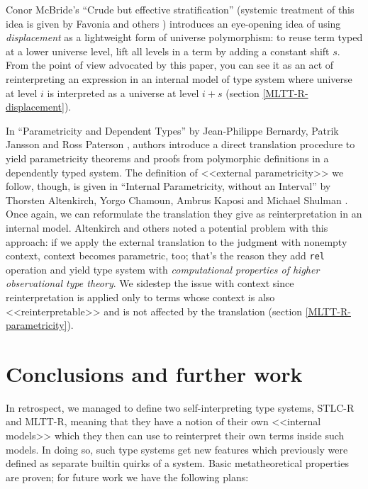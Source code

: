 \documentclass[acmsmall, review, screen, authorversion]{acmart}
\begin{document}
Conor McBride's ``Crude but effective stratification''
\cite{McBride:Crude2002} (systemic treatment of this idea is given by
Favonia and others \cite{Favonia:Displacement2023}) introduces an
eye-opening idea of using \textit{displacement} as a lightweight form
of universe polymorphism: to reuse term typed at a lower universe
level, lift all levels in a term by adding a constant shift $s$. From
the point of view advocated by this paper, you can see it as an act
of reinterpreting an expression in an internal model of type system
where universe at level $i$ is interpreted as a universe at level
$i+s$ (section \ref{MLTT-R-displacement}).

In ``Parametricity and Dependent Types'' by Jean-Philippe Bernardy,
Patrik Jansson and Ross Paterson \cite{Bernardy:Parametricity2010},
authors introduce a direct translation procedure to yield
parametricity theorems and proofs from polymorphic definitions in a
dependently typed system. The definition of <<external
parametricity>> we follow, though, is given in ``Internal
Parametricity, without an Interval'' by Thorsten Altenkirch, Yorgo
Chamoun, Ambrus Kaposi and Michael Shulman
\cite{Altenkirch:Parametricity2024}. Once again, we can reformulate
the translation they give as reinterpretation in an internal model.
Altenkirch and others noted a potential problem with this approach:
if we apply the external translation to the judgment with nonempty
context, context becomes parametric, too; that's the reason they add
\texttt{rel} operation and yield type system with
\textit{computational properties of higher observational type
theory}. We sidestep the issue with context since reinterpretation
is applied only to terms whose context is also <<reinterpretable>>
and is not affected by the translation
(section \ref{MLTT-R-parametricity}).

\section{Conclusions and further work}

In retrospect, we managed to define two self-interpreting type
systems, STLC-R and MLTT-R, meaning that they have a notion of their
own <<internal models>> which they then can use to reinterpret their
own terms inside such models. In doing so, such type systems get new
features which previously were defined as separate builtin quirks of
a system. Basic metatheoretical properties are proven; for future
work we have the following plans:
\end{document}
